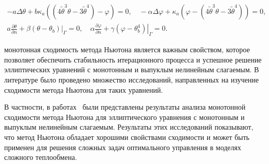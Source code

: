 \[
    \begin{gathered}
        -a \Delta \theta+b \kappa_{a}\left(\left(4 \widetilde{\theta}^{3}
        \theta-3 \widetilde{\theta}^{4}\right)-\varphi\right)=0,
        \quad-\alpha \Delta \varphi
        +\kappa_{a}\left(\varphi
        -\left(4 \widetilde{\theta}^{3}
        \theta-3 \widetilde{\theta}^{4}\right)\right)=0, \\
        a \frac{\partial \theta}{\partial n}
        +\left.\beta\left(\theta-\theta_{b}\right)\right|_{\Gamma}=0,
        \quad \alpha \frac{\partial \varphi}{\partial n}
        +\left.\gamma\left(\varphi-\theta_{b}^{4}\right)\right|_{\Gamma}=0.
    \end{gathered}
\]

монотонная сходимость метода Ньютона является важным свойством,
которое позволяет обеспечить стабильность итерационного процесса
и успешное решение эллиптических уравнений с монотонным и выпуклым нелинейным слагаемым.
В литературе было проведено множество исследований, направленных на изучение
сходимости метода Ньютона для таких уравнений.

В частности, в работах~\cite{Mukhamadiev1971, Schryer1971} были представлены
результаты анализа монотонной сходимости метода Ньютона для эллиптического
уравнения с монотонным и выпуклым нелинейным слагаемым.
Результаты этих исследований показывают, что метод Ньютона обладает
хорошими свойствами сходимости и может быть применен для решения
сложных задач оптимального управления в моделях сложного теплообмена.
